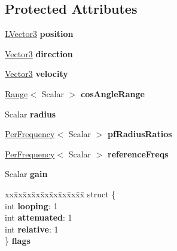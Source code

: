 \subsection*{Protected Attributes}
\begin{DoxyCompactItemize}
\item 
\hyperlink{classAudio_1_1TVector3}{L\+Vector3} {\bfseries position}\hypertarget{classAudio_1_1Source_a0e6586f8f49003f1e81e4ebe8d029eb9}{}\label{classAudio_1_1Source_a0e6586f8f49003f1e81e4ebe8d029eb9}

\item 
\hyperlink{classAudio_1_1TVector3}{Vector3} {\bfseries direction}\hypertarget{classAudio_1_1Source_ac33c1c24a3cc7a442490b0911a941852}{}\label{classAudio_1_1Source_ac33c1c24a3cc7a442490b0911a941852}

\item 
\hyperlink{classAudio_1_1TVector3}{Vector3} {\bfseries velocity}\hypertarget{classAudio_1_1Source_a8cdbf9671d013f5f56b9bf1b7490c58f}{}\label{classAudio_1_1Source_a8cdbf9671d013f5f56b9bf1b7490c58f}

\item 
\hyperlink{structAudio_1_1Range}{Range}$<$ Scalar $>$ {\bfseries cos\+Angle\+Range}\hypertarget{classAudio_1_1Source_a0e670ea587b7ff929ee5aa37a30bf805}{}\label{classAudio_1_1Source_a0e670ea587b7ff929ee5aa37a30bf805}

\item 
Scalar {\bfseries radius}\hypertarget{classAudio_1_1Source_af238275de344ded2a0a79dbf2220c952}{}\label{classAudio_1_1Source_af238275de344ded2a0a79dbf2220c952}

\item 
\hyperlink{structAudio_1_1PerFrequency}{Per\+Frequency}$<$ Scalar $>$ {\bfseries pf\+Radius\+Ratios}\hypertarget{classAudio_1_1Source_a0a5a2b7ecca049f8dc3cfe689a0cb5a0}{}\label{classAudio_1_1Source_a0a5a2b7ecca049f8dc3cfe689a0cb5a0}

\item 
\hyperlink{structAudio_1_1PerFrequency}{Per\+Frequency}$<$ Scalar $>$ {\bfseries reference\+Freqs}\hypertarget{classAudio_1_1Source_a546216a7242928a7fe0a8f52a70201f6}{}\label{classAudio_1_1Source_a546216a7242928a7fe0a8f52a70201f6}

\item 
Scalar {\bfseries gain}\hypertarget{classAudio_1_1Source_aa3926e24aa91425060814457276ed2ee}{}\label{classAudio_1_1Source_aa3926e24aa91425060814457276ed2ee}

\item 
\begin{tabbing}
xx\=xx\=xx\=xx\=xx\=xx\=xx\=xx\=xx\=\kill
struct \{\\
\>int {\bfseries looping}: 1\\
\>int {\bfseries attenuated}: 1\\
\>int {\bfseries relative}: 1\\
\} {\bfseries flags}\hypertarget{classAudio_1_1Source_a4308f26b7f97b065521b171636b44b9a}{}\label{classAudio_1_1Source_a4308f26b7f97b065521b171636b44b9a}
\\


\end{tabbing}
\end{DoxyCompactItemize}
